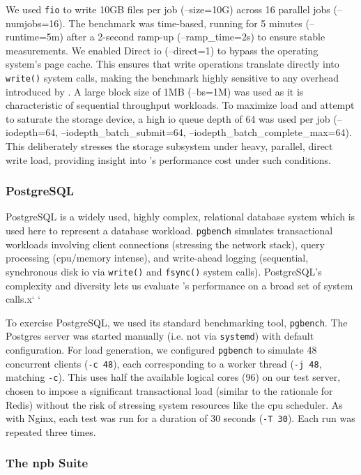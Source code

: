 We used \texttt{fio} to write 10GB files per job (--size=10G) across 16 parallel jobs 
(--numjobs=16).  The benchmark was time-based, running for 5 minutes 
(--runtime=5m) after a 2-second ramp-up (--ramp\_time=2s) to ensure stable 
measurements. We enabled Direct \ac{io} (--direct=1) to bypass the
operating system's page cache. This ensures that write operations translate 
directly into \texttt{write()} system calls, making the benchmark highly sensitive 
to any overhead introduced by \af. A large block size of 1MB (--bs=1M) was 
used as it is characteristic of sequential throughput workloads. To maximize 
load and attempt to saturate the storage device, a high \ac{io} queue depth of 64
was used per job (--iodepth=64, --iodepth\_batch\_submit=64,
--iodepth\_batch\_complete\_max=64). This deliberately stresses the storage 
subsystem under heavy, parallel, direct write load, providing insight into 
\af's performance cost under such conditions.

\subsubsection{PostgreSQL}\label{subsubsec:psql-just}

PostgreSQL is a widely used, highly complex, relational database system which is
used here to represent a database workload. \texttt{pgbench} simulates
transactional workloads involving client connections (stressing the network
stack), query processing (\ac{cpu}/memory intense), and write-ahead logging
(sequential, synchronous disk \ac{io} via \texttt{write()} and \texttt{fsync()}
system calls). PostgreSQL's complexity and diversity lets us evaluate \af's
performance on a broad set of system calls.x` `

To exercise PostgreSQL, we used its standard benchmarking tool, 
\texttt{pgbench}. The Postgres server was started manually (i.e. not via
\texttt{systemd}) with default configuration. For load generation, we configured 
\texttt{pgbench} to simulate 48 concurrent clients (\texttt{-c 48}), each
corresponding to a worker thread (\texttt{-j 48}, matching \texttt{-c}).
This uses half the available logical cores (96) on our
test server, chosen to impose a significant transactional load (similar to
the rationale for Redis) without the risk of stressing system resources like the
\ac{cpu} scheduler. As with Nginx, each test was run for a duration of 30
seconds (\texttt{-T 30}). Each run was repeated three times.

\subsubsection{The \ac{npb} Suite}\label{subsubsec:npb-just}


